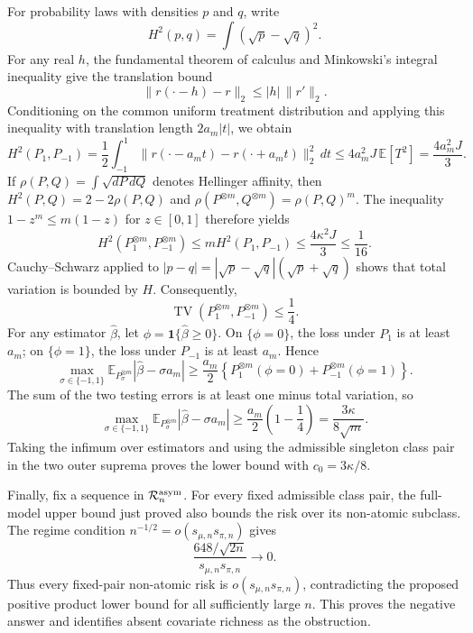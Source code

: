 For probability laws with densities \(p\) and \(q\), write
\[
H^2(p,q)=\int(\sqrt p-\sqrt q)^2.
\]
For any real \(h\), the fundamental theorem of calculus and Minkowski's integral inequality give the translation bound
\[
\|r(\cdot-h)-r\|_2\le|h|\,\|r'\|_2.
\]
Conditioning on the common uniform treatment distribution and applying this inequality with translation length \(2a_m|t|\), we obtain
\[
H^2(P_1,P_{-1})=\frac12\int_{-1}^1\|r(\cdot-a_mt)-r(\cdot+a_mt)\|_2^2\,dt\le4a_m^2J\,\mathbb E[T^2]=\frac{4a_m^2J}{3}.
\]
If \(\rho(P,Q)=\int\sqrt{dP\,dQ}\) denotes Hellinger affinity, then \(H^2(P,Q)=2-2\rho(P,Q)\) and \(\rho(P^{\otimes m},Q^{\otimes m})=\rho(P,Q)^m\). The inequality \(1-z^m\le m(1-z)\) for \(z\in[0,1]\) therefore yields
\[
H^2(P_1^{\otimes m},P_{-1}^{\otimes m})\le mH^2(P_1,P_{-1})\le\frac{4\kappa^2J}{3}\le\frac1{16}.
\]
Cauchy--Schwarz applied to \(|p-q|=|\sqrt p-\sqrt q|(\sqrt p+\sqrt q)\) shows that total variation is bounded by \(H\). Consequently,
\[
\operatorname{TV}(P_1^{\otimes m},P_{-1}^{\otimes m})\le\frac14.
\]
For any estimator \(\widehat\beta\), let \(\phi=\mathbf 1\{\widehat\beta\ge0\}\). On \(\{\phi=0\}\), the loss under \(P_1\) is at least \(a_m\); on \(\{\phi=1\}\), the loss under \(P_{-1}\) is at least \(a_m\). Hence
\[
\max_{\sigma\in\{-1,1\}}\mathbb E_{P_\sigma^{\otimes m}}|\widehat\beta-\sigma a_m|\ge\frac{a_m}{2}\left\{P_1^{\otimes m}(\phi=0)+P_{-1}^{\otimes m}(\phi=1)\right\}.
\]
The sum of the two testing errors is at least one minus total variation, so
\[
\max_{\sigma\in\{-1,1\}}\mathbb E_{P_\sigma^{\otimes m}}|\widehat\beta-\sigma a_m|\ge\frac{a_m}{2}\left(1-\frac14\right)=\frac{3\kappa}{8\sqrt m}.
\]
Taking the infimum over estimators and using the admissible singleton class pair in the two outer suprema proves the lower bound with \(c_0=3\kappa/8\).

Finally, fix a sequence in \(\mathcal R_n^{\rm asym}\). For every fixed admissible class pair, the full-model upper bound just proved also bounds the risk over its non-atomic subclass. The regime condition \(n^{-1/2}=o(s_{\mu,n}s_{\pi,n})\) gives
\[
\frac{648/\sqrt{2n}}{s_{\mu,n}s_{\pi,n}}\longrightarrow0.
\]
Thus every fixed-pair non-atomic risk is \(o(s_{\mu,n}s_{\pi,n})\), contradicting the proposed positive product lower bound for all sufficiently large \(n\). This proves the negative answer and identifies absent covariate richness as the obstruction.